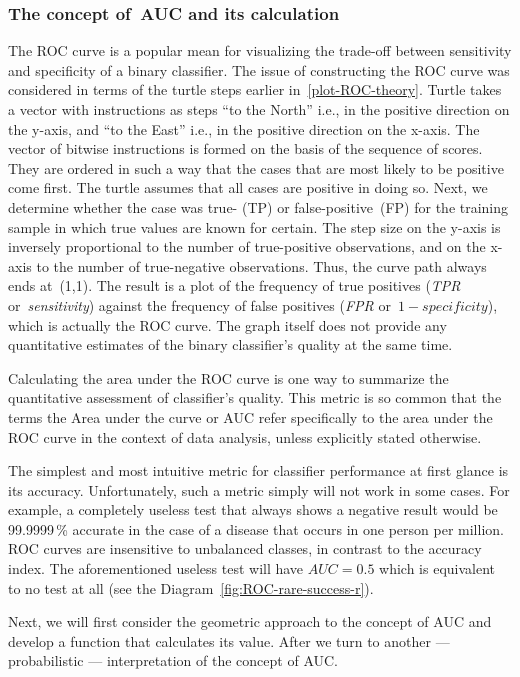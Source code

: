 \documentclass[]{scrreprt}
\begin{document}
\subsubsection{The concept of~AUC and its calculation}\label{calculate-AUC-theory}
The ROC curve is a popular mean for visualizing the trade-off between sensitivity and specificity of a binary classifier. The issue of constructing the ROC curve was considered in terms of the turtle steps earlier in~\ref{plot-ROC-theory}. Turtle takes a vector with instructions as steps ``to the North'' i.e., in the positive direction on the y-axis, and ``to the East'' i.e., in the positive direction on the x-axis. The vector of bitwise instructions is formed on the basis of the sequence of scores. They are ordered in such a way that the cases that are most likely to be positive come first. The turtle assumes that all cases are positive in doing so. Next, we determine whether the case was true- (TP) or false-positive~(FP) for the training sample in which true values are known for certain. The step size on the y-axis is inversely proportional to the number of true-positive observations, and on the x-axis to the number of true-negative observations. Thus, the curve path always ends at~(1,1). The result is a plot of the frequency of true positives (\textit{TPR} or~\textit{sensitivity}) against the frequency of false positives (\textit{FPR} or~$1-specificity$), which is actually the ROC curve. The graph itself does not provide any quantitative estimates of the binary classifier's quality at the same time. 

Calculating the area under the ROC curve is one way to summarize the quantitative assessment of classifier's quality. This metric is so common that the terms the Area under the curve or AUC refer specifically to the area under the ROC curve in the context of data analysis, unless explicitly stated otherwise.

The simplest and most intuitive metric for classifier performance at first glance is its accuracy. Unfortunately, such a metric simply will not work in some cases. For example, a completely useless test that always shows a negative result would be 99.9999\,\% accurate in the case of a disease that occurs in one person per million. ROC curves are insensitive to unbalanced classes, in contrast to the accuracy index. The aforementioned useless test will have $AUC=0.5$ which is equivalent to no test at all (see the Diagram~\ref{fig:ROC-rare-success-r}).

Next, we will first consider the geometric approach to the concept of AUC and develop a function that calculates its value. After we turn to another --- probabilistic --- interpretation of the concept of AUC.
\end{document}
